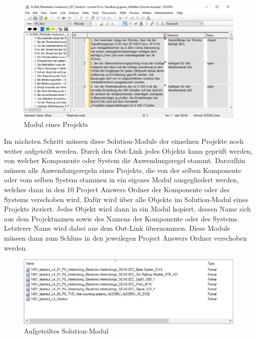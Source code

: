 \begin{figure}[H]
    \centering
    \includegraphics[width = \textwidth]{abbildungen/Solutions.PNG}
    \caption{Modul eines Projekts}
    \label{fig:SolutionsModul}
\end{figure}

Im nächsten Schritt müssen diese Solution-Module der einzelnen Projekte noch weiter aufgeteilt werden. Durch den Out-Link jedes Objekts kann geprüft werden, von welcher Komponente oder System die
Anwendungsregel stammt. Daraufhin müssen alle Anwendungsregeln eines Projekts, die von der selben Komponente oder vom selben System stammen in ein eigenes Modul ausgegliedert werden, welches dann
in den 10 Project Answers Ordner der Komponente oder des Systems verschoben wird. Dafür wird über alle Objekte im Solution-Modul eines Projekts iteriert. Jedes Objekt wird dann 
in ein Modul kopiert, dessen Name sich aus dem Projektnamen sowie des Namens der Komponente oder des Systems. Letzterer Name wird dabei aus dem Out-Link übernommen. Diese Module müssen dann 
zum Schluss in den jeweilegen Project Answers Ordner verschoben werden.

\begin{figure}[H]
    \centering
    \includegraphics[width = \textwidth]{abbildungen/Aufgeteilte Module.PNG}
    \caption{Aufgeteiltes Solution-Modul}
    \label{fig:AufgeteilteModule}
\end{figure}

